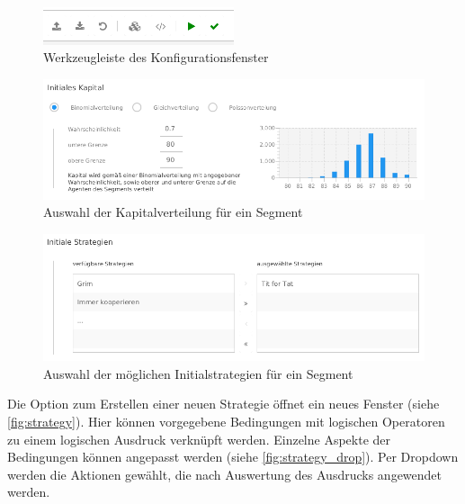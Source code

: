 \documentclass[parskip=full,11pt]{scrartcl}
\begin{document}
\begin{figure}[hb]
	\centering
	\includegraphics[width=0.5\textwidth]{images/konfig_tool2.png}
	\caption{\label{fig:konfig_tool}
		Werkzeugleiste des Konfigurationsfenster}
\end{figure}

\begin{figure}[hb]
	\centering
	\includegraphics[width=\textwidth]{images/konfig_cap.png}
	\caption{\label{fig:konfig_cap}
		Auswahl der Kapitalverteilung für ein Segment}
\end{figure}

\begin{figure}[hb]
	\centering
	\includegraphics[width=\textwidth]{images/konfig_strat.png}
	\caption{\label{fig:konfig_strat}
		Auswahl der möglichen Initialstrategien für ein Segment}
\end{figure}

\newpage


Die Option zum Erstellen einer neuen \Gls{Strategie} öffnet ein neues Fenster (siehe \cref{fig:strategy}). Hier können vorgegebene Bedingungen mit logischen Operatoren zu einem logischen Ausdruck verknüpft werden. Einzelne Aspekte der Bedingungen können angepasst werden (siehe \cref{fig:strategy_drop}). Per Dropdown werden die Aktionen gewählt, die nach Auswertung des Ausdrucks angewendet werden.
\end{document}
